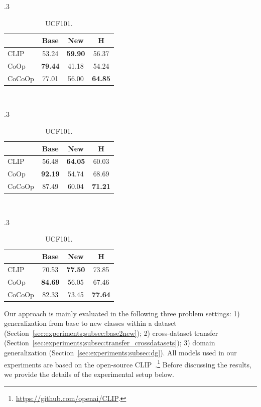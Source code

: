 \documentclass[10pt,twocolumn,letterpaper]{article}
\begin{document}
\begin{table}[t]
\begin{subtable}[t]{.3\textwidth}
    \begin{tabular}{l cc|c}
    \toprule
    & Base & New & H \\
    \midrule
    CLIP & 53.24 & \textbf{59.90} & 56.37 \\
    CoOp & \textbf{79.44} & 41.18 & 54.24 \\
    \rowcolor{tabhighlight}
    CoCoOp & 77.01 & 56.00 & \textbf{64.85} \\
    \bottomrule
    \end{tabular}
    \end{subtable}
    ~
    \begin{subtable}[t]{.3\textwidth}
    \centering
    \caption{EuroSAT.}
    \begin{tabular}{l cc|c}
    \toprule
    & Base & New & H \\
    \midrule
    CLIP & 56.48 & \textbf{64.05} & 60.03 \\
    CoOp & \textbf{92.19} & 54.74 & 68.69 \\
    \rowcolor{tabhighlight}
    CoCoOp & 87.49 & 60.04 & \textbf{71.21} \\
    \bottomrule
    \end{tabular}
    \end{subtable}
    ~
    \begin{subtable}[t]{.3\textwidth}
    \centering
    \caption{UCF101.}
    \begin{tabular}{l cc|c}
    \toprule
    & Base & New & H \\
    \midrule
    CLIP & 70.53 & \textbf{77.50} & 73.85 \\
    CoOp & \textbf{84.69} & 56.05 & 67.46 \\
    \rowcolor{tabhighlight}
    CoCoOp & 82.33 & 73.45 & \textbf{77.64} \\
    \bottomrule
    \end{tabular}
    \end{subtable}
\end{table}

Our approach is mainly evaluated in the following three problem settings: 1) generalization from base to new classes within a dataset (Section~\ref{sec:experiments;subsec:base2new}); 2) cross-dataset transfer (Section~\ref{sec:experiments;subsec:transfer_crossdatasets}); 3) domain generalization (Section~\ref{sec:experiments;subsec:dg}). All models used in our experiments are based on the open-source CLIP~\cite{radford2021learning}.\footnote{\url{https://github.com/openai/CLIP}.} Before discussing the results, we provide the details of the experimental setup below.
\end{document}
